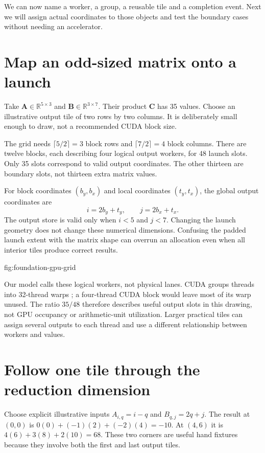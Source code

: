 We can now name a worker, a group, a reusable tile and a completion
event. Next we will assign actual coordinates to those objects and
test the boundary cases without needing an accelerator.
\section{Map an odd-sized matrix onto a launch}
Take $\mathbf{A}\in\mathbb{R}^{5\times3}$ and
$\mathbf{B}\in\mathbb{R}^{3\times7}$. Their product
$\mathbf{C}$ has 35 values. Choose an illustrative output
tile of two rows by two columns. It is deliberately small
enough to draw, not a recommended CUDA block size.

The grid needs $\lceil5/2\rceil=3$ block rows and
$\lceil7/2\rceil=4$ block columns. There are twelve blocks,
each describing four logical output workers, for 48 launch
slots. Only 35 slots correspond to valid output coordinates.
The other thirteen are boundary slots, not thirteen extra
matrix values.

For block coordinates $(b_y,b_x)$ and local coordinates
$(t_y,t_x)$, the global output coordinates are
\[
 i=2b_y+t_y,\qquad j=2b_x+t_x.
\]
The output store is valid only when $i<5$ and $j<7$.
Changing the launch geometry does not change these numerical
dimensions. Confusing the padded launch extent with the
matrix shape can overrun an allocation even when all
interior tiles produce correct results.

{fig:foundation-gpu-grid}

Our model calls these logical workers, not physical lanes.
CUDA groups threads into 32-thread warps
\cite{nvidia2026programmingmodel}; a four-thread CUDA block
would leave most of its warp unused. The ratio $35/48$
therefore describes useful output slots in this drawing,
not GPU occupancy or arithmetic-unit utilization. Larger
practical tiles can assign several outputs to each thread
and use a different relationship between workers and values.

\section{Follow one tile through the reduction dimension}
Choose explicit illustrative inputs $A_{i,q}=i-q$ and
$B_{q,j}=2q+j$. The result at $(0,0)$ is
$0(0)+(-1)(2)+(-2)(4)=-10$. At $(4,6)$ it is
$4(6)+3(8)+2(10)=68$. These two corners are useful
hand fixtures because they involve both the first and
last output tiles.

